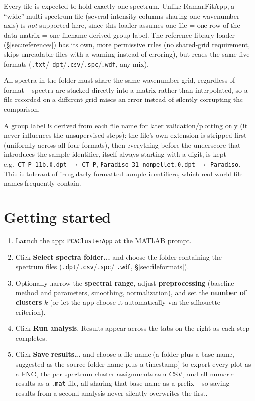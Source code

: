 \documentclass[11pt,a4paper]{article}
\newcommand{\code}[1]{\texttt{#1}}
\begin{document}
Every file is expected to hold exactly one spectrum. Unlike RamanFitApp, a
``wide'' multi-spectrum file (several intensity columns sharing one
wavenumber axis) is \emph{not} supported here, since this loader assumes
one file = one row of the data matrix = one filename-derived group label.
The reference library loader (\S\ref{sec:references}) has its own, more
permissive rules (no shared-grid requirement, skips unreadable files with
a warning instead of erroring), but reads the same five formats
(\code{.txt}/\code{.dpt}/\code{.csv}/\code{.spc}/\code{.wdf}, any mix).

All spectra in the folder must share the same wavenumber grid, regardless
of format -- spectra are stacked directly into a matrix rather than
interpolated, so a file recorded on a different grid raises an error
instead of silently corrupting the comparison.

A group label is derived from each file name for later validation/plotting
only (it never influences the unsupervised steps): the file's own
extension is stripped first (uniformly across all four formats), then
everything before the underscore that introduces the sample identifier,
itself always starting with a digit, is kept -- e.g.\
\code{CT\_P\_11b.0.dpt} $\to$ \code{CT\_P},
\code{Paradiso\_31-nonpellet.0.dpt} $\to$ \code{Paradiso}. This is tolerant of
irregularly-formatted sample identifiers, which real-world file names
frequently contain.

\section{Getting started}
\begin{enumerate}
  \item Launch the app: \code{PCAClusterApp} at the MATLAB prompt.
  \item Click \textbf{Select spectra folder...} and choose the folder
  containing the spectrum files (\code{.dpt}/\code{.csv}/\code{.spc}/
  \code{.wdf}, \S\ref{sec:fileformats}).
  \item Optionally narrow the \textbf{spectral range}, adjust
  \textbf{preprocessing} (baseline method and parameters, smoothing,
  normalization), and set the \textbf{number of clusters} $k$ (or let the
  app choose it automatically via the silhouette criterion).
  \item Click \textbf{Run analysis}. Results appear across the tabs on the
  right as each step completes.
  \item Click \textbf{Save results...} and choose a file name (a folder
  plus a base name, suggested as the source folder name plus a timestamp)
  to export every plot as a PNG, the per-spectrum cluster assignments as
  a CSV, and all numeric results as a \code{.mat} file, all sharing that
  base name as a prefix -- so saving results from a second analysis never
  silently overwrites the first.
\end{enumerate}
\end{document}
